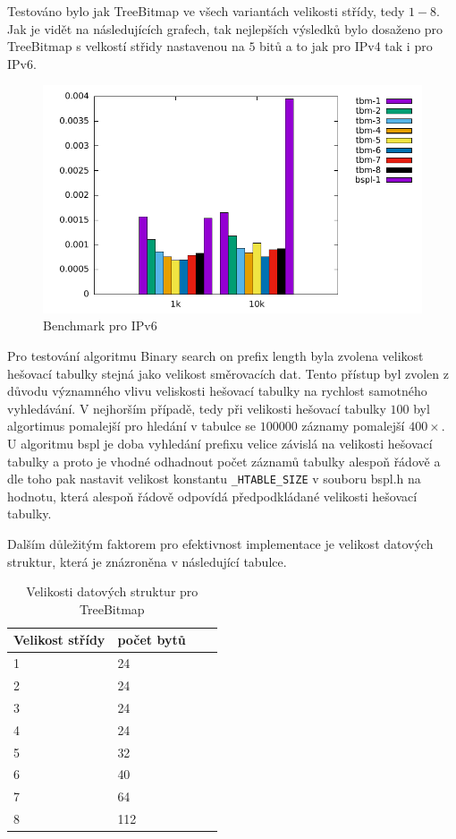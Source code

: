 Testováno bylo jak TreeBitmap ve všech variantách velikosti střídy, tedy $1-8$.
Jak je vidět na následujících grafech, tak nejlepších výsledků bylo dosaženo pro TreeBitmap s velkostí
střidy nastavenou na $5$ bitů a to jak pro IPv4 tak i pro IPv6.

\begin{figure}[!htbp]
	\centering
	\includegraphics[scale=1]{fig/lpm-ipv6.pdf}
	\caption{Benchmark pro IPv6}
\end{figure}\label{fig:lpm-ipv4}

Pro testování algoritmu Binary search on prefix length byla zvolena velikost hešovací tabulky
stejná jako velikost směrovacích dat. Tento přístup byl zvolen z důvodu významného vlivu
veliskosti hešovací tabulky na rychlost samotného vyhledávání. V nejhorším případě, tedy při
velikosti hešovací tabulky $100$ byl algortimus pomalejší pro hledání v tabulce se $100 000$ záznamy pomalejší
$400\times$.
U algoritmu bspl je doba vyhledání prefixu velice závislá na velikosti hešovací tabulky a proto je vhodné odhadnout počet záznamů tabulky alespoň řádově a dle toho pak nastavit velikost konstantu {\tt \_HTABLE\_SIZE} v souboru bspl.h na hodnotu, která alespoň řádově odpovídá předpodkládané velikosti hešovací tabulky.

Dalším důležitým faktorem pro efektivnost implementace je velikost datových struktur, která je znázroněna v následující tabulce.

\begin{table}[!htbp]
	\center
	\label{tab:lpm-input}
    \begin{tabular}{|l|l|l|l|}
    \hline
    Velikost střídy & počet bytů \\ \hline
    1 & 24 \\ \hline
    2 & 24 \\ \hline
    3 & 24 \\ \hline
    4 & 24 \\ \hline
    5 & 32 \\ \hline
    6 & 40 \\ \hline
    7 & 64 \\ \hline
    8 & 112 \\ \hline
    \end{tabular}
	\caption{Velikosti datových struktur pro TreeBitmap}
\end{table}

